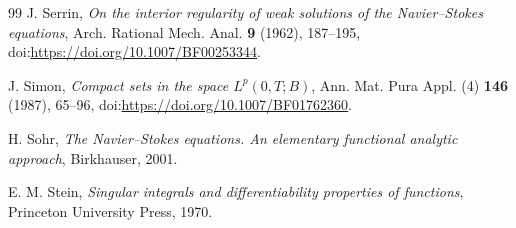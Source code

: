 \documentclass[11pt]{amsart}
\theoremstyle{plain}
\theoremstyle{definition}
\theoremstyle{remark}
\numberwithin{equation}{section}
\begin{document}
\begin{thebibliography}{99}
J. Serrin,
\emph{On the interior regularity of weak solutions of the Navier--Stokes equations},
Arch. Rational Mech. Anal. \textbf{9} (1962), 187--195,
doi:\url{https://doi.org/10.1007/BF00253344}.

J. Simon,
\emph{Compact sets in the space \(L^p(0,T;B)\)},
Ann. Mat. Pura Appl. (4) \textbf{146} (1987), 65--96,
doi:\url{https://doi.org/10.1007/BF01762360}.

H. Sohr,
\emph{The Navier--Stokes equations. An elementary functional analytic approach},
Birkhauser, 2001.

E. M. Stein,
\emph{Singular integrals and differentiability properties of functions},
Princeton University Press, 1970.

\end{thebibliography}
\end{document}
